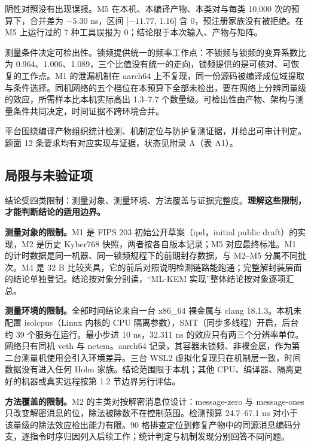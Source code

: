 阴性对照没有出现误报。M5 在本机、本编译产物、本类对与每类 10,000 次的预算下，合并差为 $-5.30$ ns，区间 [$-11.77$, 1.16] 含 0，预注册家族没有被拒绝。在 M5 上运行过的 7 种工具误报为 0；结论限于本次输入、产物与矩阵。%

测量条件决定可检出性。锁频提供统一的频率工作点：不锁频与锁频的变异系数比为 0.964、1.006、1.089，三个比值没有统一的走向，锁频提供的是可核对、可恢复的工作点。M1 的泄漏机制在 aarch64 上不复现，同一份源码被编译成位域提取与条件选择。同机网络的五个档位在本预算下全部未检出，要在网络上分辨同量级的效应，所需样本比本机实际高出 1.3--7.7 个数量级。可检出性由产物、架构与测量条件共同决定，时间证据不跨环境合并。%

平台围绕编译产物组织统计检测、机制定位与防护复测证据，并给出可审计判定。题面 12 条要求均有对应实现与证据，状态见附录 A（表 A1）。

\subsection{局限与未验证项}

结论受四类限制：测量对象、测量环境、方法覆盖与证据完整度。\textbf{理解这些限制，才能判断结论的适用边界。}

\textbf{测量对象的限制。}M1 是 FIPS 203\cite{fips203} 初始公开草案（ipd，initial public draft）的实现，M2 是历史 Kyber768\cite{kyber2018} 快照，两者按各自版本记录；M5 对应最终标准。M1 的计时数据是同一机器、同一锁频规程下的前期封存数据，与 M2--M5 分属不同批次。M4 是 32 B 比较夹具，它的前后对照说明检测链路能跑通；完整解封装层面的结论单独登记。结论按对象分别读，“ML-KEM 实现”整体结论按对象逐项汇总。

\textbf{测量环境的限制。}全部时间结论来自一台 x86\_64 裸金属与 clang 18.1.3。本机未配置 isolcpus（Linux 内核的 CPU 隔离参数），SMT（同步多线程）开启，后台约 39 个服务在运行。最小步进 10 ns，32.311 ns 的效应只有两三个分辨率单位。网络只有同机 veth 与 netem。aarch64 记录，其容器未锁频、非裸金属，作为第二台测量机使用会引入环境差异。三台 WSL2 虚拟化复现只在机制层一致，时间数据没有进入任何 Holm 家族。结论范围限于本机；其他 CPU、编译器、隔离更好的机器或真实远程按第 1.2 节边界另行评估。%

\textbf{方法覆盖的限制。}M2 的主类对按解密消息位设计：message-zero 与 message-ones 只改变解密消息的位，除法被除数不在控制范围。检测预算 24.7--67.1 ns 对小于该量级的除法效应检出能力有限。90 格排查定位到修复产物中的同源消息编码分支，逐指令时序归因列入后续工作；统计判定与机制发现分别回答不同问题。

